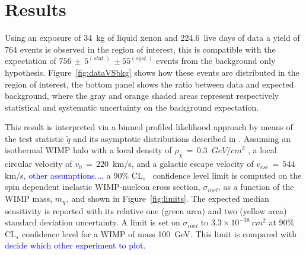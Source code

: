 \section{Results}
\label{sec:results}

Using an exposure of 34~kg of liquid xenon and 224.6~live days of data a yield of 764 events is observed  in the region of interest,
this is compatible with the expectation of $756 \, \pm \, 5^{(stat.)} \, \pm 55^{(syst.)}$ events from the background only hypothesis. 
Figure~\ref{fig:dataVSbkg} shows how these events are distributed in the region of interest, the bottom panel shows the ratio
between data and expected background, where the gray and orange shaded areas represent respectively statistical and systematic uncertainty 
on the background expectation.

This result is interpreted via a binned profiled likelihood approach by means of the test statistic $\tilde{q}$
and its asymptotic distributions described in \cite{asympt}. 
Assuming  an isothermal WIMP halo with a local density of $\rho_{\chi} \, = \, 0.3$~$GeV/cm^3$ , a local circular velocity of $v_0 \,= \, 220$~km/s, and a galactic escape velocity of $v_{esc} \, = \, 544$ km/s, 
\textcolor{blue}{other assumptions...,} a 90\% CL$_s$~\cite{cls} confidence level limit is  
computed on the spin dependent inelastic WIMP-nucleon cross section, $\sigma_{inel}$, as a function of the WIMP mass, $m_{\chi}$, and shown in Figure~\ref{fig:limits}.
The expected median sensitivity is reported with its relative one (green area) and two (yellow area) standard deviation uncertainty.
A  limit is set on $\sigma_{inel}$ to $3.3 \times 10^{-38} ~cm^{2}$ at 90\% CL$_s$ confidence level for a WIMP of mass 100~GeV. This limit is compared with
\textcolor{blue}{decide which other experiment to plot.}

